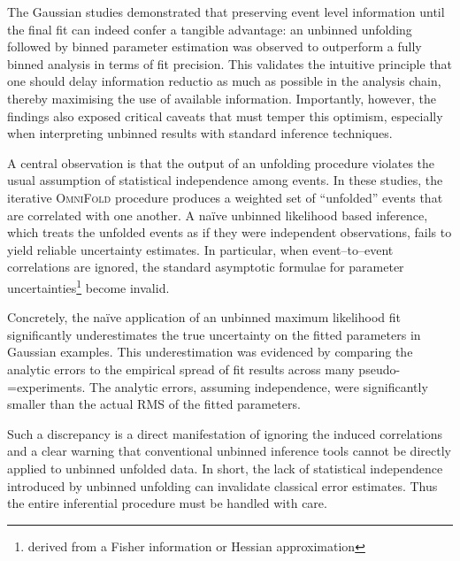     The Gaussian studies demonstrated that preserving event level information until the final fit can indeed confer a tangible advantage: an unbinned unfolding followed by binned parameter estimation was observed to outperform a fully binned analysis in terms of fit precision.
    This validates the intuitive principle that one should delay information reductio as much as possible in the analysis chain, thereby maximising the use of available information.
    Importantly, however, the findings also exposed critical caveats that must temper this optimism, especially when interpreting unbinned results with standard inference techniques.

    A central observation is that the output of an unfolding procedure violates the usual assumption of statistical independence among events.
    In these studies, the iterative \textsc{OmniFold} procedure produces a weighted set of ``unfolded'' events that are correlated with one another.
    A na\"ive unbinned likelihood based inference, which treats the unfolded events as if they were independent observations, fails to yield reliable uncertainty estimates.
    In particular, when event--to--event correlations are ignored, the standard asymptotic formulae for parameter uncertainties\footnote{derived from a Fisher information or Hessian approximation} become invalid.
    
    Concretely, the na\"ive application of an unbinned maximum likelihood fit significantly underestimates the true uncertainty on the fitted parameters in Gaussian examples.
    This underestimation was evidenced by comparing the analytic errors to the empirical spread of fit results across many pseudo-=experiments.
    The analytic errors, assuming independence, were significantly smaller than the actual RMS of the fitted parameters.
    
    Such a discrepancy is a direct manifestation of ignoring the induced correlations and a clear warning that conventional unbinned inference tools cannot be directly applied to unbinned unfolded data.
    In short, the lack of statistical independence introduced by unbinned unfolding can invalidate classical error estimates.
    Thus the entire inferential procedure must be handled with care.

